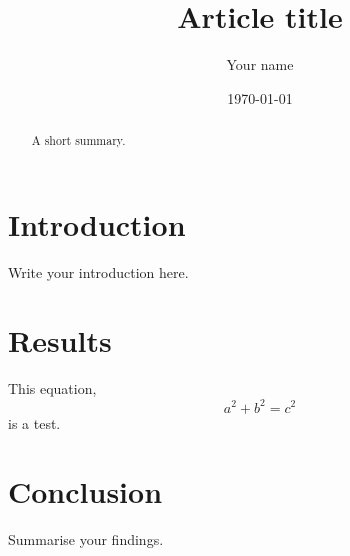 \documentclass[11pt,a4paper]{article}
\title{Article title}
\author{Your name}
\date{\today}
\begin{document}
\maketitle
\begin{abstract}
A short summary.
\end{abstract}
\section{Introduction}
Write your introduction here.
\section{Results}
This equation,
\[a^2+b^2=c^2\]
is a test.
\section{Conclusion}
Summarise your findings.
\end{document}
